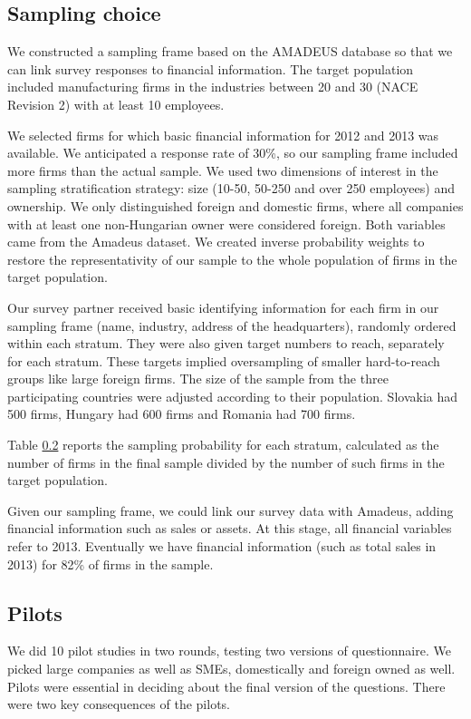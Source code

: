 \documentclass[final, dvipsnames, authoryear,12pt]{elsarticle}
\begin{document}
\subsection{Sampling choice}
We constructed a sampling frame based on the AMADEUS database \cite{amadeus} so that we can link survey responses to financial information. The target population included manufacturing firms in the industries between 20 and 30 (NACE Revision 2) with at least 10 employees.

We selected firms for which basic financial information for 2012 and 2013 was available. We anticipated a response rate of 30\%, so our sampling frame included more firms than the actual sample. We used two dimensions of interest in the sampling stratification strategy: size (10-50, 50-250 and over 250 employees) and ownership. We only distinguished foreign and domestic firms, where all companies with at least one non-Hungarian owner were considered  foreign. Both variables came from the Amadeus dataset. We created inverse probability weights to restore the representativity of our sample to the whole population of firms in the target population.

Our survey partner received basic identifying information for each firm in our sampling frame (name, industry, address of the headquarters), randomly ordered within each stratum. They were also given target numbers to reach, separately for each stratum. These targets implied oversampling of smaller hard-to-reach groups like large foreign firms. The size of the sample from the three participating countries were adjusted according to their population. Slovakia had 500 firms, Hungary had 600 firms and Romania had 700 firms.

Table \ref{} reports the sampling probability for each stratum, calculated as the number of firms in the final sample divided by the number of such firms in the target population.


Given our sampling frame, we could link our survey data with Amadeus, adding financial information such as sales or assets. At this stage, all financial variables refer to 2013. Eventually we have financial information (such as total sales in 2013) for 82\% of firms in the sample. 

\subsection{Pilots}
We did 10 pilot studies in two rounds, testing two versions of questionnaire. We picked large companies as well as SMEs, domestically and foreign owned as well. Pilots were essential in deciding about the final version of the questions. There were two key consequences of the pilots.
\end{document}
